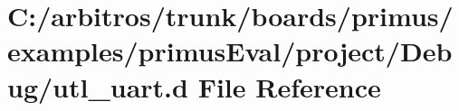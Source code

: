 \hypertarget{boards_2primus_2examples_2primus_eval_2project_2_debug_2utl__uart_8d}{\section{C\-:/arbitros/trunk/boards/primus/examples/primus\-Eval/project/\-Debug/utl\-\_\-uart.d File Reference}
\label{boards_2primus_2examples_2primus_eval_2project_2_debug_2utl__uart_8d}
}
